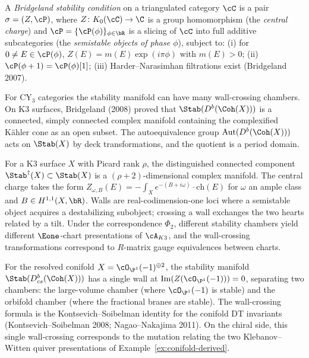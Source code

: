 \begin{definition}
\label{def:bridgeland-stability}
A \emph{Bridgeland stability condition} on a triangulated category $\cC$ is a pair $\sigma = (Z, \cP)$, where $Z \colon K_0(\cC) \to \C$ is a group homomorphism (the \emph{central charge}) and $\cP = \{\cP(\phi)\}_{\phi \in \bR}$ is a slicing of $\cC$ into full additive subcategories (the \emph{semistable objects of phase $\phi$}), subject to: (i) for $0 \neq E \in \cP(\phi)$, $Z(E) = m(E) \exp(i \pi \phi)$ with $m(E) > 0$; (ii) $\cP(\phi + 1) = \cP(\phi)[1]$; (iii) Harder--Narasimhan filtrations exist (Bridgeland 2007).
\end{definition}

For CY$_3$ categories the stability manifold can have many wall-crossing chambers. On K3 surfaces, Bridgeland (2008) proved that $\Stab(D^b(\Coh(X)))$ is a connected, simply connected complex manifold containing the complexified K\"ahler cone as an open subset. The autoequivalence group $\mathrm{Aut}(D^b(\Coh(X)))$ acts on $\Stab(X)$ by deck transformations, and the quotient is a period domain.

\begin{example}
\label{ex:stab-k3}
For a K3 surface $X$ with Picard rank $\rho$, the distinguished connected component $\Stab^\dagger(X) \subset \Stab(X)$ is a $(\rho + 2)$-dimensional complex manifold. The central charge takes the form $Z_{\omega, B}(E) = -\int_X e^{-(B + i\omega)} \cdot \mathrm{ch}(E)$ for $\omega$ an ample class and $B \in H^{1,1}(X, \bR)$. Walls are real-codimension-one loci where a semistable object acquires a destabilizing subobject; crossing a wall exchanges the two hearts related by a tilt. Under the correspondence $\Phi_2$, different stability chambers yield different $\Eone$-chart presentations of $\cA_{K3}$, and the wall-crossing transformations correspond to $R$-matrix gauge equivalences between charts.
\end{example}

\begin{example}
\label{ex:stab-conifold}
For the resolved conifold $X = \cO_{\P^1}(-1)^{\oplus 2}$, the stability manifold $\Stab(D^b_{cs}(\Coh(X)))$ has a single wall at $\mathrm{Im}(Z(\cO_{\P^1}(-1))) = 0$, separating two chambers: the large-volume chamber (where $\cO_{\P^1}(-1)$ is stable) and the orbifold chamber (where the fractional branes are stable). The wall-crossing formula is the Kontsevich--Soibelman identity for the conifold DT invariants (Kontsevich--Soibelman 2008; Nagao--Nakajima 2011). On the chiral side, this single wall-crossing corresponds to the mutation relating the two Klebanov--Witten quiver presentations of Example~\ref{ex:conifold-derived}.
\end{example}


